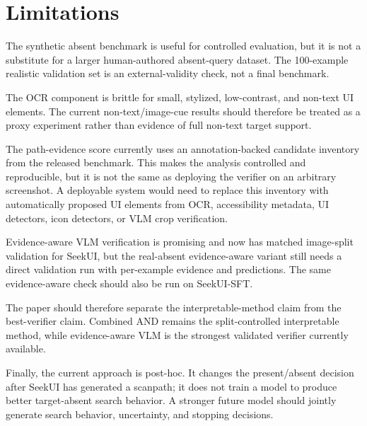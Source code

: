 \section{Limitations}

The synthetic absent benchmark is useful for controlled evaluation, but it is not a substitute for a larger human-authored absent-query dataset. The 100-example realistic validation set is an external-validity check, not a final benchmark.

The OCR component is brittle for small, stylized, low-contrast, and non-text UI elements. The current non-text/image-cue results should therefore be treated as a proxy experiment rather than evidence of full non-text target support.

The path-evidence score currently uses an annotation-backed candidate inventory from the released benchmark. This makes the analysis controlled and reproducible, but it is not the same as deploying the verifier on an arbitrary screenshot. A deployable system would need to replace this inventory with automatically proposed UI elements from OCR, accessibility metadata, UI detectors, icon detectors, or VLM crop verification.

Evidence-aware VLM verification is promising and now has matched image-split validation for SeekUI, but the real-absent evidence-aware variant still needs a direct validation run with per-example evidence and predictions. The same evidence-aware check should also be run on SeekUI-SFT.

The paper should therefore separate the interpretable-method claim from the best-verifier claim. Combined AND remains the split-controlled interpretable method, while evidence-aware VLM is the strongest validated verifier currently available.

Finally, the current approach is post-hoc. It changes the present/absent decision after SeekUI has generated a scanpath; it does not train a model to produce better target-absent search behavior. A stronger future model should jointly generate search behavior, uncertainty, and stopping decisions.
